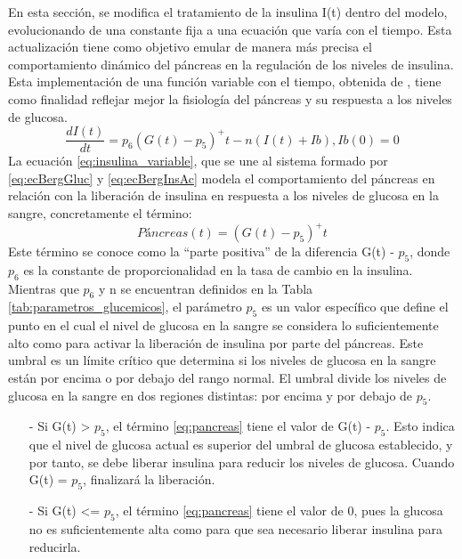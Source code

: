 En esta sección, se modifica el tratamiento de la insulina I(t) dentro del modelo, evolucionando de una constante fija a una ecuación que varía con el tiempo. Esta actualización tiene como objetivo emular de manera más precisa el comportamiento dinámico del páncreas en la regulación de los niveles de insulina. Esta implementación de una función variable con el tiempo, obtenida de \cite{alonso2014modelos}, tiene como finalidad reflejar mejor la fisiología del páncreas y su respuesta a los niveles de glucosa.
\begin{equation}
    \frac{dI(t)}{dt} = p_6 (G(t)-p_5)^+ t -n(I(t)+Ib), Ib(0)=0
    \label{eq:insulina_variable}
\end{equation}
La ecuación \eqref{eq:insulina_variable}, que se une al sistema formado por \eqref{eq:ecBergGluc} y \eqref{eq:ecBergInsAc}  modela el comportamiento del páncreas en relación con la liberación de insulina en respuesta a los niveles de glucosa en la sangre, concretamente el término:
\begin{equation}
    Páncreas (t)= (G(t)-p_5)^+ t 
    \label{eq:pancreas}
\end{equation}
Este término se conoce como la “parte positiva” de la diferencia G(t) - $p_5$, donde $p_6$ es la constante de proporcionalidad en la tasa de cambio en la insulina. Mientras que $p_6$ y n se encuentran definidos en la Tabla \ref{tab:parametros_glucemicos}, el parámetro $p_5$ es un valor específico que define el punto en el cual el nivel de glucosa en la sangre se considera lo suficientemente alto como para activar la liberación de insulina por parte del páncreas. Este umbral es un límite crítico que determina si los niveles de glucosa en la sangre están por encima o por debajo del rango normal.
El umbral divide los niveles de glucosa en la sangre en dos regiones distintas: por encima y por debajo de $p_5$.
\begin{enumerate} \label{sec:p5}
    \item[-] Si G(t) > $p_5$, el término \eqref{eq:pancreas}  tiene el valor de G(t) - $p_5$. Esto indica que el nivel de glucosa actual es superior del umbral de glucosa establecido, y por tanto, se debe liberar insulina para reducir los niveles de glucosa. Cuando G(t) = $p_5$, finalizará la liberación.
    \item[-] Si G(t) <= $p_5$, el término \eqref{eq:pancreas} tiene el valor de 0, pues la glucosa no es suficientemente alta como para que sea necesario liberar insulina para reducirla.
\end{enumerate}

